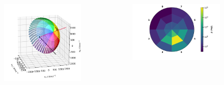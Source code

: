 \documentclass{beamer}
\begin{document}
\begin{frame}{}
\begin{columns}
		\begin{figure}
			\includegraphics[scale=0.4]{Pics/coll_aa.pdf}
		\end{figure}
	\column[]{7.5cm}
		\begin{figure}
			\includegraphics[scale=0.4]{Pics/hist_det_sec_aa_90days2001.pdf}
		\end{figure}
\end{columns}
\end{frame}
\end{document}

